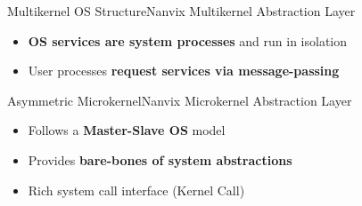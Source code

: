 		\begin{frame}[fragile]{Multikernel OS Structure}{Nanvix Multikernel Abstraction Layer}

			\begin{itemize}
				\item \textbf{OS services are system processes} and run in isolation
			\end{itemize}
			\begin{itemize}
				\item User processes \textbf{request services via message-passing}
			\end{itemize}


		\end{frame}

		\begin{frame}[fragile]{Asymmetric Microkernel}{Nanvix Microkernel Abstraction Layer}

			\begin{itemize}
				\item Follows a \textbf{Master-Slave OS} model
				\item Provides \textbf{bare-bones of system abstractions}
				\item Rich system call interface (Kernel Call)
			\end{itemize}


		\end{frame}

